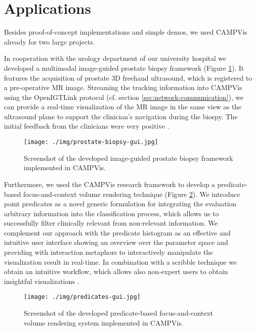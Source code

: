 \section{Applications}
\label{sec:applications}

Besides proof-of-concept implementations and simple demos, we used CAMPVis already for two large projects.

In cooperation with the urology department of our university hospital we developed a multimodal image-guided prostate biopsy framework (Figure \ref{fig:prostate-biopsy-gui}).
It features the acquisition of prostate 3D freehand ultrasound, which is registered to a pre-operative MR image.
Streaming the tracking information into CAMPVis using the OpenIGTLink protocol (cf. section \ref{sec:network-communication}), we can provide a real-time visualization of the MR image in the same view as the ultrasound plane to support the clinician's navigation during the biospy.
The initial feedback from the clinicians were very positive \cite{shah2014opensource}.

\begin{figure}[ht]
	\centering
	\texttt{[image: ./img/prostate-biopsy-gui.jpg]}
	\caption{Screenshot of the developed image-guided prostate biopsy framework \cite{shah2014opensource} implemented in CAMPVis.}
	\label{fig:prostate-biopsy-gui}
\end{figure}

Furthermore, we used the CAMPVis research framework to develop a predicate-based focus-and-context volume rendering technique (Figure \ref{fig:predicates-gui}).
We introduce point predicates as a novel generic formulation for integrating the evaluation arbitrary information into the classification process, which allows us to successfully filter clinically relevant from non-relevant information. 
We complement our approach with the predicate histogram as an effective and intuitive user interface showing an overview over the parameter space and providing with interaction metaphors to interactively manipulate the visualization result in real-time. 
In combination with a scribble technique we obtain an intuitive workflow, which allows also non-expert users to obtain insightful visualizations \cite{schultezub2014ieeevis}.

\begin{figure}[ht]
	\centering
	\texttt{[image: ./img/predicates-gui.jpg]}
	\caption{Screenshot of the developed predicate-based focus-and-context volume rendering system \cite{schultezub2014ieeevis} implemented in CAMPVis.}
	\label{fig:predicates-gui}
\end{figure}


